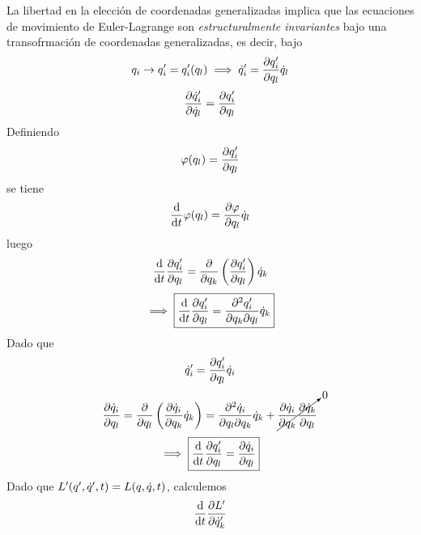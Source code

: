 La libertad en la elección de coordenadas generalizadas implica que las ecuaciones de movimiento de Euler-Lagrange son \textit{estructuralmente invariantes} bajo una transofrmación de coordenadas generalizadas, es decir, bajo
\begin{equation}
  q_i\to q'_i=q'_i(q_l)\implies \dot{q} '_i=\pdv{q'_i}{q_l}\dot{q}_l
\end{equation}
\begin{equation}
  \pdv{\dot{q}'_i}{\dot{q}_l}=\pdv{q'_i}{q_l}
\end{equation}
Definiendo 
\begin{equation}
  \varphi(q_l)=\pdv{q'_i}{q_l}
\end{equation}
se tiene
\begin{equation}
  \dv{t}\varphi(q_l)=\pdv{\varphi}{q_l}\dot{q}_l
\end{equation}
luego
\begin{equation}
  \dv{t}\pdv{q'_i}{q_l}=\pdv{q_k}\left(\pdv{q'_i}{q_l}\right)\dot{q}_k
\end{equation}
\begin{equation}\label{1.1}
  \implies \boxed{\dv{t}\pdv{q'_i}{q_l}=\pdv{q'_i}{q_k}{q_l}\dot{q}_k}
\end{equation}
Dado que
\begin{equation}
  \dot{q}'_i=\pdv{q'_i}{q_l}\dot{q}_i
\end{equation}
\begin{equation}\label{1.2}
  \pdv{\dot{q}_i}{q_l}=\pdv{q_l}\left(\pdv{\dot{q}_i}{q_k}\dot{q}_k\right)=\pdv{\dot{q}_i}{q_l}{q_k}\dot{q}_k+\cancelto{0}{\pdv{\dot{q}_i}{q_k}\pdv{\dot{q}_k}{q_l}}
\end{equation}
\begin{equation}
  \implies \boxed{\dv{t}\pdv{q'_i}{q_l}=\pdv{\dot{q}_i}{q_l}}
\end{equation}
Dado que $L'(q',\dot{q}',t)=L(q,\dot{q},t)$, calculemos
\begin{equation}
  \dv{t}\pdv{L'}{\dot{q}'_k}
\end{equation}























